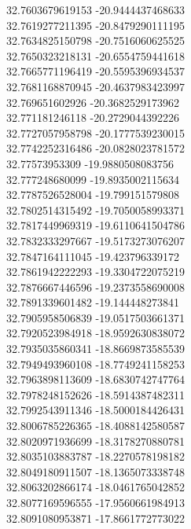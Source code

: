 {32.7603679619153	-20.9444437468633\\
32.7619277211395	-20.8479290111195\\
32.7634825150798	-20.7516060625525\\
32.7650323218131	-20.6554759441618\\
32.7665771196419	-20.5595396934537\\
32.7681168870945	-20.4637983423997\\
32.769651602926	-20.3682529173962\\
32.771181246118	-20.2729044392226\\
32.7727057958798	-20.1777539230015\\
32.7742252316486	-20.0828023781572\\
32.77573953309	-19.9880508083756\\
32.777248680099	-19.8935002115634\\
32.7787526528004	-19.799151579808\\
32.7802514315492	-19.7050058993371\\
32.7817449969319	-19.6110641504786\\
32.7832333297667	-19.5173273076207\\
32.7847164111045	-19.423796339172\\
32.7861942222293	-19.3304722075219\\
32.7876667446596	-19.2373558690008\\
32.7891339601482	-19.144448273841\\
32.7905958506839	-19.0517503661371\\
32.7920523984918	-18.9592630838072\\
32.7935035860341	-18.8669873585539\\
32.7949493960108	-18.7749241158253\\
32.7963898113609	-18.6830742747764\\
32.7978248152626	-18.5914387482311\\
32.7992543911346	-18.5000184426431\\
32.8006785226365	-18.4088142580587\\
32.8020971936699	-18.3178270880781\\
32.8035103883787	-18.2270578198182\\
32.8049180911507	-18.1365073338748\\
32.8063202866174	-18.0461765042852\\
32.8077169596555	-17.9560661984913\\
32.8091080953871	-17.8661772773022\\
}
